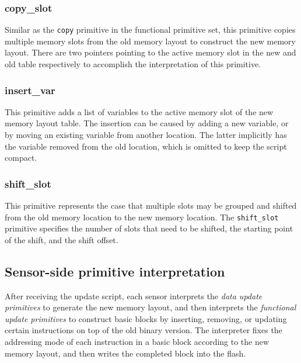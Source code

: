 \subsubsection{copy\_slot}  Similar as the {\tt copy} primitive in the functional primitive set, this primitive copies 
multiple memory slots from the old memory layout to construct the new memory layout. There are two pointers pointing to 
the active memory slot in the new and old table respectively to accomplish the interpretation of this primitive.

\subsubsection{insert\_var} This primitive adds a list of variables to the active memory slot of the new memory layout 
table.
The insertion can be caused by adding a new variable, or by moving an existing variable from another location. The 
latter implicitly has the variable removed from the old location, which is omitted to keep the script compact. 

\subsubsection{shift\_slot} This primitive represents the case that multiple slots may be grouped and shifted from the 
old memory location to the new memory location. The {\tt shift\_slot} primitive specifies the number of slots that need 
to be shifted, the starting point of the shift, and the shift offset.


\subsection{Sensor-side primitive interpretation}

After receiving the update script, each sensor interprets the {\it data update primitives} to generate the new memory 
layout, and then interprets the {\it functional update primitives} to construct basic blocks by inserting, removing, or 
updating certain instructions on top of the old binary version. The interpreter fixes the addressing mode of each 
instruction in a basic block according to the new memory layout, and then writes the completed block into the flash.


